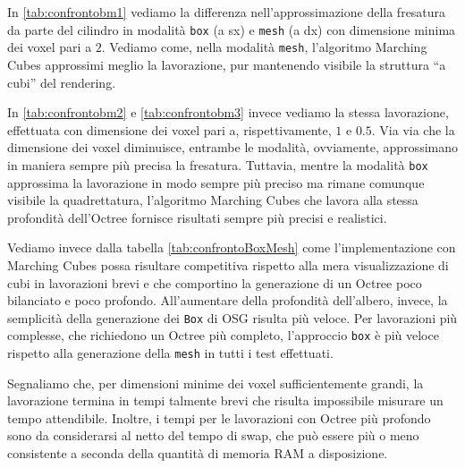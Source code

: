 In \ref{tab:confrontobm1} vediamo la differenza nell'approssimazione della fresatura da parte del cilindro in modalità \texttt{box} (a sx) e \texttt{mesh} (a dx) con dimensione minima dei voxel pari a $2$. Vediamo come, nella modalità \texttt{mesh}, l'algoritmo Marching Cubes approssimi meglio la lavorazione, pur mantenendo visibile la struttura ``a cubi'' del rendering.

In \ref{tab:confrontobm2} e \ref{tab:confrontobm3} invece vediamo la stessa lavorazione, effettuata con dimensione dei voxel pari a, rispettivamente, $1$ e $0.5$. Via via che la dimensione dei voxel diminuisce, entrambe le modalità, ovviamente, approssimano in maniera sempre più precisa la fresatura. Tuttavia, mentre la modalità \texttt{box} approssima la lavorazione in modo sempre più preciso ma rimane comunque visibile la quadrettatura, l'algoritmo Marching Cubes che lavora alla stessa profondità dell'Octree fornisce risultati sempre più precisi e realistici.

Vediamo invece dalla tabella \ref{tab:confrontoBoxMesh} come l'implementazione con Marching Cubes possa risultare competitiva rispetto alla mera visualizzazione di cubi in lavorazioni brevi e che comportino la generazione di un Octree poco bilanciato e poco profondo. All'aumentare della profondità dell'albero, invece, la semplicità della generazione dei \texttt{Box} di OSG risulta più veloce. Per lavorazioni più complesse, che richiedono un Octree più completo, l'approccio \texttt{box} è più veloce rispetto alla generazione della \texttt{mesh} in tutti i test effettuati.

Segnaliamo che, per dimensioni minime dei voxel sufficientemente grandi, la lavorazione termina in tempi talmente brevi che risulta impossibile misurare un tempo attendibile. Inoltre, i tempi per le lavorazioni con Octree più profondo sono da considerarsi al netto del tempo di swap, che può essere più o meno consistente a seconda della quantità di memoria RAM a disposizione.

